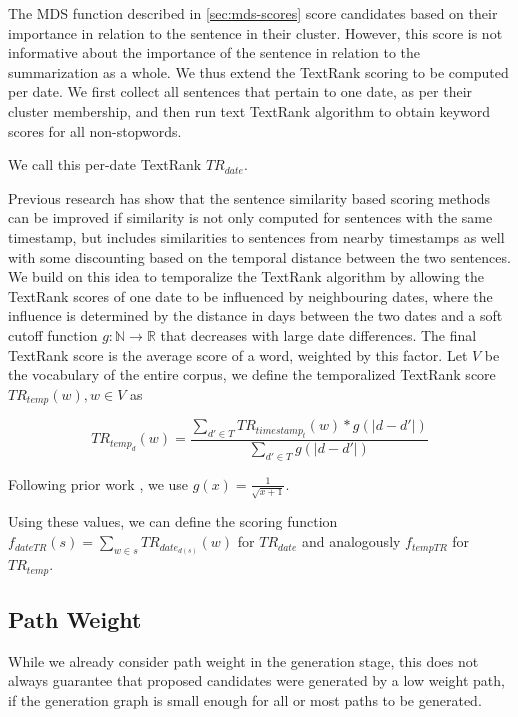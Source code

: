 \documentclass[a4paper,BCOR=10mm]{report}
\begin{document}
The MDS function described in \ref{sec:mds-scores} score candidates based on their importance in relation to the sentence in their cluster. However, this score is not informative about the importance of the sentence in relation to the summarization as a whole.
We thus extend the TextRank scoring to be computed per date. We first collect all sentences that pertain to one date, as per their cluster membership, and then run text TextRank algorithm to obtain keyword scores for all non-stopwords.

We call this per-date TextRank $TR_{date}$.

Previous research \citet{yan, markert} has show that the sentence similarity based scoring methods can be improved if similarity is not only computed for sentences with the same timestamp, but includes similarities to sentences from nearby timestamps as well with some discounting based on the temporal distance between the two sentences.
We build on this idea to temporalize the TextRank algorithm by allowing the TextRank scores of one date to be influenced by neighbouring dates, where the influence is determined by the distance in days between the two dates and a soft cutoff function $g: \mathbb{N} \rightarrow \mathbb{R}$ that decreases with large date differences.
The final TextRank score is the average score of a word, weighted by this factor.
Let $V$ be the vocabulary of the entire corpus, we define the temporalized TextRank score $TR_{temp}(w), w \in V$ as

\begin{displaymath}
    TR_{temp_d}(w) = \frac{\sum_{d' \in T} TR_{{timestamp}_t}(w) * g(|d - d'|)}{\sum_{d' \in T} g(|d - d'|)}
\end{displaymath}

Following prior work \citep{yan}, we use $g(x) = \frac{1}{\sqrt{x + 1}}$.

Using these values, we can define the scoring function $f_{dateTR}(s) = \sum_{w \in s} TR_{date_{d(s)}}(w)$ for $TR_{date}$ and analogously $f_{tempTR}$ for $TR_{temp}$.

\subsection{Path Weight}

While we already consider path weight in the generation stage, this does not always guarantee that proposed candidates were generated by a low weight path, if the generation graph is small enough for all or most paths to be generated.
\end{document}
